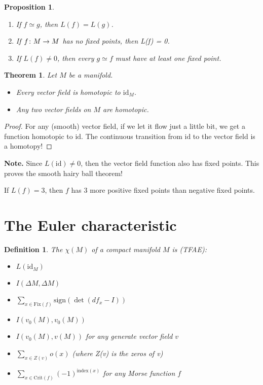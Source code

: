 \documentclass[11pt]{amsbook}
\newenvironment{dateenv}{
	\vspace{1em}
}{
	\vspace{1em}
}
\newcommand{\mydate}[4]{
	\newdate{#1}{#2}{#3}{#4}
	\begin{dateenv}
		\hfill\displaydate{#1}
	\end{dateenv}
}
\theoremstyle{mystyle} %
\newtheorem{thrm}[thm]{Theorem}
\newtheorem{defi}[thm]{Definition}
\newtheorem{propo}[thm]{Proposition}
\numberwithin{thm}{section}
\newcommand{\id}{\text{id}}
\newcommand{\Fix}{\text{Fix}}
\newcommand{\sign}{\text{sign}}
\newcommand{\Crit}{\text{Crit}}
\newcommand{\homotopic}{\simeq}
\begin{document}
\begin{propo}
	\begin{enumerate}
		\item If $f \homotopic g$, then $L(f) = L(g)$.

		\item If $f\colon M \to M$ has no fixed points, then L(f) = 0.

		\item If $L(f) \neq 0$, then every $g \homotopic f$ must have at least one fixed point.
	\end{enumerate}
\end{propo}

\begin{thrm}
	Let $M$ be a manifold.
	\begin{itemize}
		\item Every vector field is homotopic to $\id_M$.
		\item Any two vector fields on $M$ are homotopic.
	\end{itemize}
\end{thrm}
\begin{proof}
	For any (smooth) vector field, if we let it flow just a little bit, we get a function homotopic to $\id$. The continuous transition from $\id$ to the vector field is a homotopy!
\end{proof}

\textbf{Note.}
Since $L(\id) \neq 0$, then the vector field function also has fixed points. This proves the smooth hairy ball theorem!

\begin{rmk}
	If $L(f) = 3$, then $f$ has 3 more positive fixed points than negative fixed points.
\end{rmk}

\mydate{d18}{28}{11}{2016}

\section{The Euler characteristic}

\begin{defi}
	The  $\chi(M)$ of a compact manifold $M$ is (TFAE):
	\begin{itemize}
		\item $L(\id_M)$
		\item $I(\Delta M, \Delta M)$
		\item $\sum_{x \in \Fix(f)} \sign(\det(df_x - I))$
		\item $I(v_0(M), v_0(M))$
		\item $I(v_0(M), v(M))$ for any generate vector field $v$
		\item $\sum_{x \in Z(v)} o(x)$ (where Z(v) is the zeros of v)
		\item $\sum_{x \in \Crit(f)} (-1)^{\text{index}(x)}$ for any Morse function $f$
	\end{itemize}
\end{defi}
\end{document}
